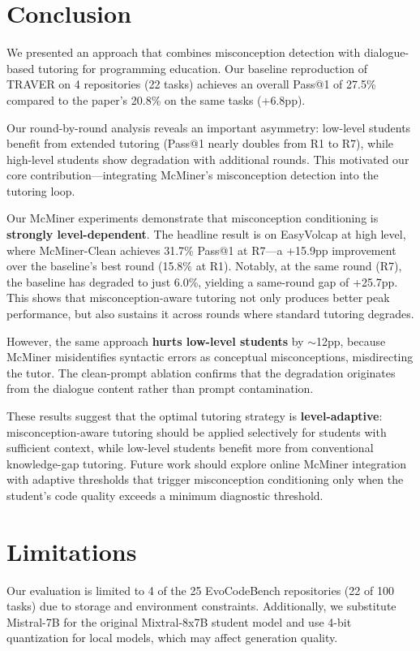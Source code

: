 \documentclass[11pt]{article}
\begin{document}
\section{Conclusion}

We presented an approach that combines misconception detection with dialogue-based tutoring for programming education. Our baseline reproduction of TRAVER on 4 repositories (22 tasks) achieves an overall Pass@1 of 27.5\% compared to the paper's 20.8\% on the same tasks (+6.8pp).

Our round-by-round analysis reveals an important asymmetry: low-level students benefit from extended tutoring (Pass@1 nearly doubles from R1 to R7), while high-level students show degradation with additional rounds. This motivated our core contribution---integrating McMiner's misconception detection into the tutoring loop.

Our McMiner experiments demonstrate that misconception conditioning is \textbf{strongly level-dependent}. The headline result is on EasyVolcap at high level, where McMiner-Clean achieves 31.7\% Pass@1 at R7---a +15.9pp improvement over the baseline's best round (15.8\% at R1). Notably, at the same round (R7), the baseline has degraded to just 6.0\%, yielding a same-round gap of +25.7pp. This shows that misconception-aware tutoring not only produces better peak performance, but also sustains it across rounds where standard tutoring degrades.

However, the same approach \textbf{hurts low-level students} by $\sim$12pp, because McMiner misidentifies syntactic errors as conceptual misconceptions, misdirecting the tutor. The clean-prompt ablation confirms that the degradation originates from the dialogue content rather than prompt contamination.

These results suggest that the optimal tutoring strategy is \textbf{level-adaptive}: misconception-aware tutoring should be applied selectively for students with sufficient context, while low-level students benefit more from conventional knowledge-gap tutoring. Future work should explore online McMiner integration with adaptive thresholds that trigger misconception conditioning only when the student's code quality exceeds a minimum diagnostic threshold.


\section*{Limitations}

Our evaluation is limited to 4 of the 25 EvoCodeBench repositories (22 of 100 tasks) due to storage and environment constraints. Additionally, we substitute Mistral-7B for the original Mixtral-8x7B student model and use 4-bit quantization for local models, which may affect generation quality.
\end{document}
